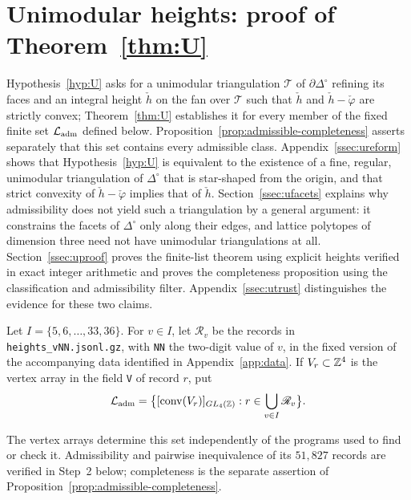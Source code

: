 \section{Unimodular heights: proof of Theorem~\ref{thm:U}}\label{app:unimodular}

Hypothesis~\ref{hyp:U} asks for a unimodular triangulation $\mathcal T$ of $\partial\Delta^\circ$ refining its faces and an
integral height $\check h$ on the fan over $\mathcal T$ such that $\check h$ and $\check h-\check\varphi$ are strictly convex;
Theorem~\ref{thm:U} establishes it for every member of the fixed finite set $\mathcal L_{\rm adm}$ defined below.
Proposition~\ref{prop:admissible-completeness} asserts separately that this set contains every admissible class. Appendix~\ref{ssec:ureform} shows that Hypothesis~\ref{hyp:U} is equivalent to the existence of
a fine, regular, unimodular triangulation of $\Delta^\circ$ that is star-shaped from the origin, and that strict convexity
of $\check h-\check\varphi$ implies that of $\check h$. Section~\ref{ssec:ufacets} explains why admissibility does not
yield such a triangulation by a general argument: it constrains the facets of $\Delta^\circ$ only along their edges, and
lattice polytopes of dimension three need not have unimodular triangulations at all. Section~\ref{ssec:uproof} proves the
finite-list theorem using explicit heights verified in exact integer arithmetic and proves the completeness proposition
using the classification and admissibility filter. Appendix~\ref{ssec:utrust} distinguishes the evidence for these two claims.

\begin{definition}\label{def:admlist}
Let $I=\{5,6,\ldots,33,36\}$. For $v\in I$, let $\mathscr R_v$ be the records in
\texttt{heights\_vNN.jsonl.gz}, with \texttt{NN} the two-digit value of $v$, in the fixed version of the accompanying
data identified in Appendix~\ref{app:data}. If $V_r\subset\mathbb Z^4$ is the vertex array in the field \texttt{V} of record
$r$, put
\[
\mathcal L_{\rm adm}=\bigl\{[\operatorname{conv}(V_r)]_{GL_4(\mathbb Z)}:
 r\in\bigcup_{v\in I}\mathscr R_v\bigr\}.
\]
\end{definition}
The vertex arrays determine this set independently of the programs used to find or check it. Admissibility and
pairwise inequivalence of its $51{,}827$ records are verified in Step~2 below; completeness is the separate assertion of
Proposition~\ref{prop:admissible-completeness}.

